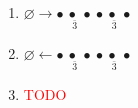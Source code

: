 \begin{enumerate}
    \item $\boxed{\varnothing}\rightarrow \underset{\bar 3}{\boxed{\bullet\ \bullet\ \bullet}}\  \underset{\bar 3}{\boxed{\bullet\ \bullet\ \bullet}}$
    \item $\boxed{\varnothing}\leftarrow \underset{\bar 3}{\boxed{\bullet\ \bullet\ \bullet}}\  \underset{\bar 3}{\boxed{\bullet\ \bullet\ \bullet}}$
    \item \textcolor{red}{TODO}
  \end{enumerate}
